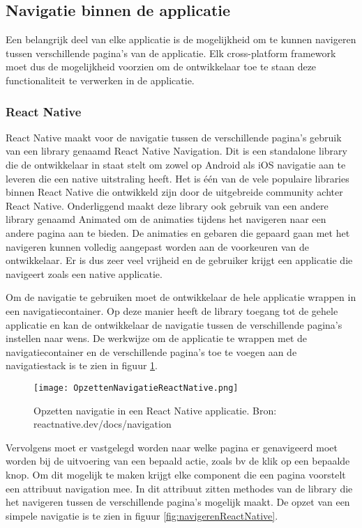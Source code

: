 \subsection{Navigatie binnen de applicatie}
\label{subsec:navigatieApplicatie}

Een belangrijk deel van elke applicatie is de mogelijkheid om te kunnen navigeren tussen verschillende pagina's van de applicatie. Elk cross-platform framework moet dus de mogelijkheid voorzien om de ontwikkelaar toe te staan deze functionaliteit te verwerken in de applicatie.

\subsubsection{React Native}
\label{subsubsec:navigatieReactNative}

React Native maakt voor de navigatie tussen de verschillende pagina's gebruik van een library genaamd React Native Navigation. Dit is een standalone library die de ontwikkelaar in staat stelt om zowel op Android als iOS navigatie aan te leveren die een native uitstraling heeft. Het is één van de vele populaire libraries binnen React Native die ontwikkeld zijn door de uitgebreide community achter React Native. Onderliggend maakt deze library ook gebruik van een andere library genaamd Animated om de animaties tijdens het navigeren naar een andere pagina aan te bieden. De animaties en gebaren die gepaard gaan met het navigeren kunnen volledig aangepast worden aan de voorkeuren van de ontwikkelaar. Er is dus zeer veel vrijheid en de gebruiker krijgt een applicatie die navigeert zoals een native applicatie. 

Om de navigatie te gebruiken moet de ontwikkelaar de hele applicatie wrappen in een navigatiecontainer. Op deze manier heeft de library toegang tot de gehele applicatie en kan de ontwikkelaar de navigatie tussen de verschillende pagina's instellen naar wens. De werkwijze om de applicatie te wrappen met de navigatiecontainer en de verschillende pagina's toe te voegen aan de navigatiestack is te zien in figuur \ref{fig:opzettenNavigatieReactNative}.

\begin{figure}
    \texttt{[image: OpzettenNavigatieReactNative.png]}
    \caption{Opzetten navigatie in een React Native applicatie. Bron: reactnative.dev/docs/navigation}
    \label{fig:opzettenNavigatieReactNative}
\end{figure}

Vervolgens moet er vastgelegd worden naar welke pagina er genavigeerd moet worden bij de uitvoering van een bepaald actie, zoals bv de klik op een bepaalde knop. Om dit mogelijk te maken krijgt elke component die een pagina voorstelt een attribuut navigation mee. In dit attribuut zitten methodes van de library die het navigeren tussen de verschillende pagina's mogelijk maakt. De opzet van een simpele navigatie is te zien in figuur \ref{fig:navigerenReactNative}. 

